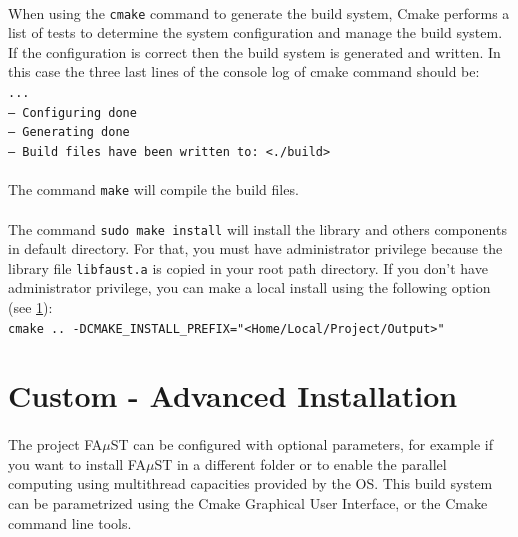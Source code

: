 \paragraph{}When using the \texttt{cmake} command to generate the build system, Cmake performs a list of tests to determine the system configuration and manage the build system. If the configuration is correct then the build system is generated and written. In this case the three last lines of the console log of cmake command should be: \\
\texttt{... \\
-- Configuring done \\
-- Generating done \\
-- Build files have been written to: <./build>}

\paragraph{}The command \texttt{make} will compile the build files.

\paragraph{}The command \texttt{sudo make install} will install the library and others components in default directory. For that, you must have administrator privilege because the library file \texttt{libfaust.a} is copied in your root path directory. If you don't have administrator privilege, you can make a local install using the following option (see \ref{sec:UnixCustomInstall}): \\
\texttt{cmake .. -DCMAKE\_INSTALL\_PREFIX="<Home/Local/Project/Output>"}


\section{Custom - Advanced Installation}\label{sec:UnixCustomInstall}

\paragraph{}The project FA$\mu$ST can be configured with optional parameters, for example if you want to install FA$\mu$ST in a different folder or to enable the parallel computing using multithread capacities provided by the OS. This build system can be parametrized using the Cmake Graphical User Interface, or the Cmake command line tools. 

